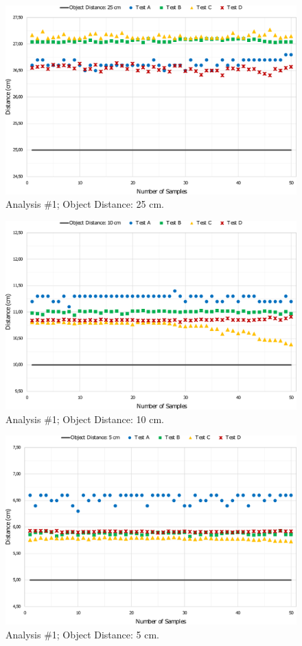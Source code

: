 \begin{figure}[h!]
    \centering
    \includegraphics[scale=0.52]{images/Results/testing_methodology/25cm.pdf}
    \caption{Analysis \#1; Object Distance: 25 cm.}
    \label{fig:25cm}
\end{figure}

\begin{figure}[h!]
    \centering
    \includegraphics[scale=0.52]{images/Results/testing_methodology/10cm.pdf}
    \caption{Analysis \#1; Object Distance: 10 cm.}
    \label{fig:10cm}
\end{figure}

\begin{figure}[h!]
    \centering
    \includegraphics[scale=0.52]{images/Results/testing_methodology/5cm.pdf}
    \caption{Analysis \#1; Object Distance: 5 cm.}
    \label{fig:5cm}
\end{figure}

